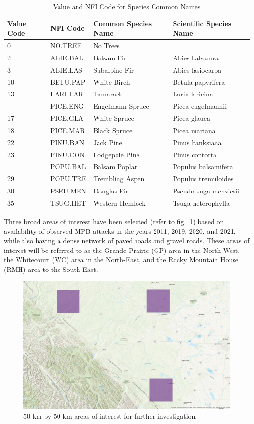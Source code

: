 \documentclass[
]{article}
\begin{document}
\begin{table}

\caption{\label{tab:species}Value and NFI Code for Species Common Names}
\centering
\begin{tabular}[t]{llll}
\toprule
Value Code & NFI Code & Common Species Name & Scientific Species Name\\
\midrule
0 & NO.TREE & No Trees & \\
2 & ABIE.BAL & Balsam Fir & Abies balsamea\\
3 & ABIE.LAS & Subalpine Fir & Abies lasiocarpa\\
10 & BETU.PAP & White Birch & Betula papyrifera\\
13 & LARI.LAR & Tamarack & Larix laricina\\
\addlinespace
16 & PICE.ENG & Engelmann Spruce & Picea engelmannii\\
17 & PICE.GLA & White Spruce & Picea glauca\\
18 & PICE.MAR & Black Spruce & Picea mariana\\
22 & PINU.BAN & Jack Pine & Pinus banksiana\\
23 & PINU.CON & Lodgepole Pine & Pinus contorta\\
\addlinespace
27 & POPU.BAL & Balsam Poplar & Populus balsamifera\\
29 & POPU.TRE & Trembling Aspen & Populus tremuloides\\
30 & PSEU.MEN & Douglas-Fir & Pseudotsuga menziesii\\
35 & TSUG.HET & Western Hemlock & Tsuga heterophylla\\
\bottomrule
\end{tabular}
\end{table}

Three broad areas of interest have been selected (refer to fig.~\ref{fig:AoIs}) based on availability of observed MPB attacks in the years 2011, 2019, 2020, and 2021, while also having a dense network of paved roads and gravel roads. These areas of interest will be referred to as the Grande Prairie (GP) area in the North-West, the Whitecourt (WC) area in the North-East, and the Rocky Mountain House (RMH) area to the South-East.

\begin{figure}

{\centering \includegraphics[width=0.8\linewidth]{../graphics/AreasOfInterest} 

}

\caption{50 km by 50 km areas of interest for further investigation.}\label{fig:AoIs}
\end{figure}
\end{document}
